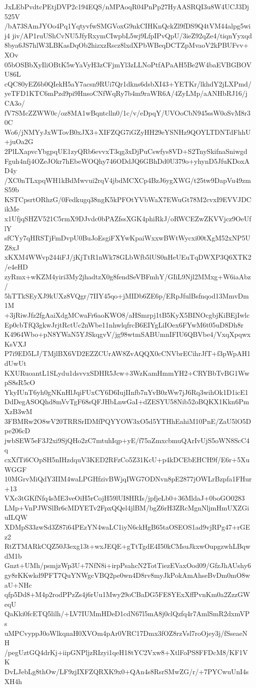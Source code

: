 JxLEbPvdtcPEtjDVP2c194EQS/nMPAoqR04PnPp27HyAASRQI3u8W4UCJ3Dj525V
/bA73SAmJYOo4Pq1YqtyvfwSMGVoxG9nkCIHKnQckZl9fDS9Q4tVM44alpg5wij4
jiv/AP1ruUShCvNU5JfyRxymCIwpbL5wj9LfpIPvQpU/3ieZ92qZe4/tiqnYyxqd
8bya6JS7hlW3LBKasDqOb2hizxzRscz8lxdXPbWBeqDCTZpMvaoV2kPBUFvv+XOv
05bOSBbXyIliOBtK5wYaVyH3zCFjmYl3zLLNoPtfAPaAH5Be2W4baEVBGBOVU86L
cQC80yEZ6b0QIekH5aY7acsn9RUi7Qr1dkns6dsbXI43+YETKr/lkhdY2jLXPmd/
yeTFD1KTC6mPzd9pi9HnsoCNfWqRy7b4m9raWR6A/4ZyLMp/aANHbRJ16/jCA3o/
fV7SMcZZWW0c/oz8MA1wBqntclln0/1c/v/eDpqY/UVOoCbN945ssW0oSvM8r30C
Wo6/jNMYyJxWTovB0xJX3+XIFZQG7iGZyHH29eYSNHz9QOYLTDNTdFhhU+juOa2G
2PlLXapvcYbgpqUE1zyQRb6evvxT3qg3xDjPuCswfys8VD+S2TnySkifnaSniwgd
Fguh4nfj4OZeJOkr7hEbeWOQhy746ODdJQ6GBhDd0U379o+yhynD5JfuKDoxAD4y
/XC0nTLxpqWH1kBdMwvui2rqV4jbdMCXCp4BzJ6ygXWG/t25tw9DapVu49zmS59b
KSTCpsrtORhzG/0Fedkugq38ngK5kPFOtYVbWaX7EWuGt78M2cvxI9EVVJDCikMe
x1UfjqSHZV521C5rmX9DJvdc0bPAZfssXGK4phiRkJ/oRWCEZwZKVVjcz9OeUflY
sfCYy7qHRSTjFmDvpU0BuJoEsgiFXYwKpaiWxxwBWtWycxi00tXgM52xNP5UZ8xJ
xKXM4WWvp244iFJ/jKjTtR1nWk78GLbWfb5lUS0nHeUEuTqDWXP3Q6XTK2/e4eHD
zyRmx+wKZM4yiri3My2jhadtzX0g8fendSeVBFmhY/GIiL9Njl2MMxg+W6iaAbz/
5hTTkSEyXJ9kUXz8VQgr/7IIY45qo+jMIDb6ZE6p/ERpJfulBsfnqod13MmvDm1M
+3jRiwJfz2fgAaiXdgMCwaFr6aoKWO8/aHSmrpj1tB5KyX5BINOcgbjKiBEjIwlc
Ep0cbTfQ3gkwJrjtRctUc2nWbe11nhwlqfrcB6EIYgLiIOex6FYwM6t05uD8Dh8r
K4964Wbo+pN8YWaN5YJSkqgvV/jg98wtmSABUmnIFIU6QBVbe4/VxqXpqwxKsVXJ
P7i9ED5LJ/TMjlBX6VD2EZZCUrAW8ZvAQQX0cCNVbrECihrJfT+f3pWpAH1dUwUt
KXURuoantL1SLydu1dsvvxSDHR5Jcw+3WzKamHmmYH2+CRYBbTvBG1WwpS8sR5cO
YkyIUnT6yh0gNKnHlJqiFUxCY6D6IujIInfb7nYvB0zWw7jJ6Rq3wihOk1D1icE1
DdDegASOQhd8mVvTgF68sQFJHbLnwGaI+dZESYU58Nib52oBQKX1Kkn6PmXzB3wM
3FBMRw2O8wV20TRRSrIDMfPQYYOW3xO5d5YTHhEahiM10PnE/ZaU5lO5Dpe206cD
jwbSEW5eF3J2xi9SjQHo2zC7mtuhIqp+yE/f75aZmxcbmuQArIvUjS5oWN8ScC4q
cxXfTi6COpSH5nIHzdquV3KED2RFzCo5Z31KcU+p4kDCEbEHCH9f/E6r+5XuWGGF
10MGrvMiQdY3IIM4waLPGHfzivBWjqIWG7ODNvn8pE2877jOWLrBzpfa1FHur+13
VXc3tGKfNfq4sME3veOiH5rCojH59lUI8HRIs/jpfjeLb0+36MldaJ+0boGO0283
LMp+VnPJWSlBr6cMDYETv2FpxQQel4jlBM/bgZ6rH3ZRcMgnNljmHmUXZGiuILQW
XDMpS33zwSd3Z87i64PEzYN4waLC1iyN6ckHgB65taOSEOS1ad9vjRPg47+rGEz2
RtZTMARkCQZ50J3exg13t+wxJEQE+gTtTgdE4I50kCMsuJkxwOupgzwhLBqwdM1b
Gnzt+UMh/psmjzWp3U+7NfN8i+irpPsahcN2TotTiezEVaxOod09/GfzJhAUshy6
gy8rKKwkd9PFT7QuYNWgcVBQ2pe0wn4D8rv8myJkPokAmAhseBvDm0mO8waU+NHc
qfp5Dd8+M4p2rodPPzZs4j6rUu1Mwy29oCBaDG5FE8YExXffPvnKm0a2ZzzGWeqU
QaKki0fcETQ5lilh/+LV7IUMmHDeD1cdN67l5mA8j0clQzfq4r7AmlSmR2dxmVPs
uMPCvyppJ0oWlkqnaH0XVOm4pAr0VRC17Dmx3fOZ8rzVsl7roOjey3j/fSseaeNH
/pegUztGQ4drKj+iipGNPljzRIzyi1qeH18tYC2Vxw8+XtlFoPS8FFDcM8/KF1VK
DvLJebLg8thOw/LF9zjIXFZQRXK9x0+QAn4s8RsrSMwZG/r/+7PYCwuUnI4sXH4h
